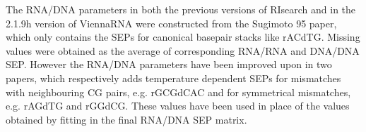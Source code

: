 The RNA/DNA parameters in both the previous versions of RIsearch and in the 2.1.9h version of ViennaRNA were constructed from the Sugimoto 95 paper\cite{ref13}, which only contains the SEPs for canonical basepair stacks like rACdTG.
Missing values were obtained as the average of corresponding RNA/RNA and DNA/DNA SEP.
However the RNA/DNA parameters have been improved upon in two papers\cite{ref14,ref15}, which respectively adds temperature dependent SEPs for mismatches with neighbouring CG pairs, e.g. rGCGdCAC and for symmetrical mismatches, e.g. rAGdTG and rGGdCG.
These values have been used in place of the values obtained by fitting in the final RNA/DNA SEP matrix.

